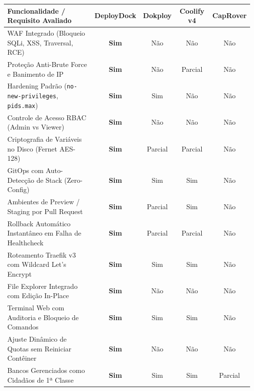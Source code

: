\begin{quadro}[htb]
    \centering
    \ABNTEXfontereduzida
    \begin{minipage}{\textwidth}
        \caption{\label{qdr:comparativo-paas}Matriz Comparativa Multidimensional entre Plataformas PaaS Abertas}
        \setlength{\tabcolsep}{3pt}
        \begin{tabular}{|p{6.5cm}|c|c|c|c|}
            \hline
            \textbf{Funcionalidade / Requisito Avaliado} & \textbf{DeployDock} & \textbf{Dokploy} & \textbf{Coolify v4} & \textbf{CapRover} \\
            \hline
            WAF Integrado (Bloqueio SQLi, XSS, Traversal, RCE) & \textbf{Sim} & Não & Não & Não \\
            \hline
            Proteção Anti-Brute Force e Banimento de IP & \textbf{Sim} & Não & Parcial & Não \\
            \hline
            Hardening Padrão (\texttt{no-new-privileges}, \texttt{pids.max}) & \textbf{Sim} & Sim & Não & Não \\
            \hline
            Controle de Acesso RBAC (Admin vs Viewer) & \textbf{Sim} & Não & Não & Não \\
            \hline
            Criptografia de Variáveis no Disco (Fernet AES-128) & \textbf{Sim} & Parcial & Parcial & Não \\
            \hline
            GitOps com Auto-Detecção de Stack (Zero-Config) & \textbf{Sim} & Sim & Sim & Não \\
            \hline
            Ambientes de Preview / Staging por Pull Request & \textbf{Sim} & Parcial & Sim & Não \\
            \hline
            Rollback Automático Instantâneo em Falha de Healthcheck & \textbf{Sim} & Parcial & Parcial & Não \\
            \hline
            Roteamento Traefik v3 com Wildcard Let's Encrypt & \textbf{Sim} & Sim & Sim & Não \\
            \hline
            File Explorer Integrado com Edição In-Place & \textbf{Sim} & Não & Não & Não \\
            \hline
            Terminal Web com Auditoria e Bloqueio de Comandos & \textbf{Sim} & Sim & Sim & Não \\
            \hline
            Ajuste Dinâmico de Quotas sem Reiniciar Contêiner & \textbf{Sim} & Não & Não & Não \\
            \hline
            Bancos Gerenciados como Cidadãos de 1ª Classe & \textbf{Sim} & Sim & Sim & Parcial \\

\end{tabular}
\end{minipage}
\end{quadro}
